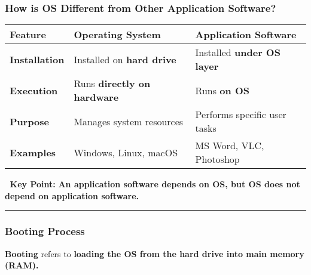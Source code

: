 \documentclass[
]{article}
\begin{document}
\subsubsection{\texorpdfstring{\textbf{How is OS Different from Other
Application
Software?}}{How is OS Different from Other Application Software?}}\label{how-is-os-different-from-other-application-software}

\begin{longtable}[]{@{}
  >{\raggedright\arraybackslash}p{}
  >{\raggedright\arraybackslash}p{}
  >{\raggedright\arraybackslash}p{}@{}}
\toprule\noalign{}
\begin{minipage}[b]{\linewidth}\raggedright
Feature
\end{minipage} & \begin{minipage}[b]{\linewidth}\raggedright
\textbf{Operating System}
\end{minipage} & \begin{minipage}[b]{\linewidth}\raggedright
\textbf{Application Software}
\end{minipage} \\
\midrule\noalign{}
\endhead
\bottomrule\noalign{}
\endlastfoot
\textbf{Installation} & Installed on \textbf{hard drive} & Installed
\textbf{under OS layer} \\
\textbf{Execution} & Runs \textbf{directly on hardware} & Runs
\textbf{on OS} \\
\textbf{Purpose} & Manages system resources & Performs specific user
tasks \\
\textbf{Examples} & Windows, Linux, macOS & MS Word, VLC, Photoshop \\
\end{longtable}

📌 \textbf{Key Point:} \textbf{An application software depends on OS,
but OS does not depend on application software.}

\begin{center}\rule{0.5\linewidth}{0.5pt}\end{center}

\subsubsection{\texorpdfstring{\textbf{Booting
Process}}{Booting Process}}\label{booting-process}

\textbf{Booting} refers to \textbf{loading the OS from the hard drive
into main memory (RAM).}
\end{document}
